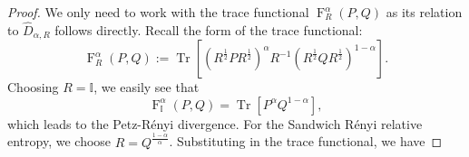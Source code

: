 \documentclass[12pt]{article}
\theoremstyle{definition}
\newcommand{\Fga}[3]{\operatorname{F}_{#3}^\alpha\left(#1, #2\right)}
\begin{document}
\begin{proof}
We only need to work with the trace functional $\Fga{P}{Q}{R}$ as its relation to $\hat D_{\alpha, R}$ follows directly. Recall the form of the trace functional:
\begin{equation}
    \Fga{P}{Q}{R} := \operatorname{Tr}\left[\left( R ^{\frac12} P R ^{\frac12} \right)^\alpha R ^{-1} \left( R ^{\frac12} Q R ^{\frac12} \right)^{1-\alpha}  \right]. 
\end{equation}
Choosing $R = \mathbb I$, we easily see that 
\begin{equation}
    \Fga{P}{Q}{\mathbb I} =  \operatorname{Tr}[P^\alpha Q ^{1-\alpha}],
\end{equation}
which leads to the Petz-R\'enyi divergence.
For the Sandwich R\'enyi relative entropy, we choose $R = Q^\frac{1-\alpha} \alpha$. Substituting in the trace functional, we have


\end{proof}
\end{document}
